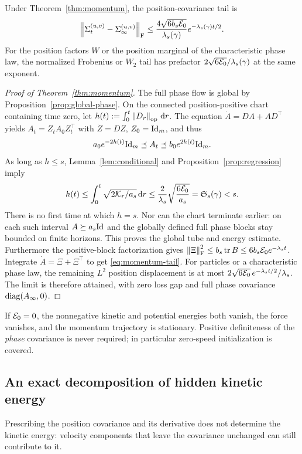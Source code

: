 Under Theorem~\ref{thm:momentum}, the position-covariance tail is
\begin{equation}\label{eq:momentum-tail}
 \left\lVert \Sigma^{(u,v)}_t-\Sigma^{(u,v)}_\infty \right\rVert_{\mathrm{F}}
 \le\frac{4\sqrt{6b_s\mathcal E_0}}{\lambda_s(\gamma)}
       e^{-\lambda_s(\gamma)t/2}.
\end{equation}
For the position factors $W$ or the position marginal of the characteristic
phase law, the normalized Frobenius or $W_2$ tail has prefactor
$2\sqrt{6\mathcal E_0}/\lambda_s(\gamma)$ at the same exponent.

\begin{proof}[Proof of Theorem~\ref{thm:momentum}]
The full phase flow is global by Proposition~\ref{prop:global-phase}.
On the connected position-positive chart containing time zero, let
$h(t):=\int_0^t\left\lVert D_r \right\rVert_{\mathrm{op}}\,\mathrm{d} r$.
The equation $\dot A=DA+AD^\top$ yields
$A_t=Z_t A_0Z_t^\top$ with $\dot Z=DZ$, $Z_0=\mathrm{Id}_m$, and thus
\[
 a_0e^{-2h(t)}\mathrm{Id}_m\preceq A_t\preceq b_0e^{2h(t)}\mathrm{Id}_m.
\]
As long as $h\le s$, Lemma~\ref{lem:conditional} and
Proposition~\ref{prop:regression} imply
\[
 h(t)\le\int_0^t\sqrt{2\mathcal{K}_r/a_s}\,\mathrm{d} r
 \le\frac{2}{\lambda_s}\sqrt{\frac{6\mathcal E_0}{a_s}}
 =\mathfrak S_s(\gamma)<s.
\]
There is no first time at which $h=s$. Nor can the chart terminate earlier:
on each such interval $A\succeq a_s\mathrm{Id}$ and the globally defined full
phase blocks stay bounded on finite horizons. This proves the global tube
and energy estimate. Furthermore the positive-block factorization gives
$\left\lVert \Xi \right\rVert_{\mathrm{F}}^2\le b_s\operatorname{tr} B\le6b_s\mathcal E_0 e^{-\lambda_st}$.
Integrate $\dot A=\Xi+\Xi^\top$ to get \eqref{eq:momentum-tail}.
For particles or a characteristic phase law, the remaining $L^2$ position displacement is
at most $2\sqrt{6\mathcal E_0}\,e^{-\lambda_st/2}/\lambda_s$.
The limit is therefore attained, with zero loss gap and full phase
covariance $\operatorname{diag}(A_\infty,0)$.
\end{proof}

If $\mathcal E_0=0$, the nonnegative kinetic and potential energies both vanish,
the force vanishes, and the momentum trajectory is stationary. Positive
definiteness of the \emph{phase} covariance is never required; in particular
zero-speed initialization is covered.

\subsection{An exact decomposition of hidden kinetic energy}
Prescribing the position covariance and its derivative does not determine
the kinetic energy: velocity components that leave the covariance
unchanged can still contribute to it.


